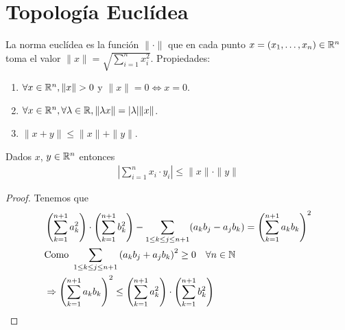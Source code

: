 \section{Topología Euclídea}

\begin{definition}
  La norma euclídea es la función \( \| \cdot \| \) que en cada punto \(x = (x_1, \ldots, x_n) \in \mathbb{R}^n\) toma el valor \( \|x\| = \sqrt{\sum_{i = 1}^n x_i^2} \).
  Propiedades: \begin{enumerate}
    \item \(\forall x \in \mathbb{R}^n, \|x\| > 0\) y \( \|x\| = 0 \iff x = 0\).
    \item \(\forall x \in \mathbb{R}^n, \forall \lambda \in \mathbb{R}, \| \lambda x\| = |\lambda| \|x\| \).
    \item \( \|x+y\| \leq \|x\| + \|y\| \).
  \end{enumerate}
\end{definition}

\begin{prop}
  Dados \(x\), \(y \in \mathbb{R}^n\) entonces \begin{align*}
    \left| \sum_{i = 1}^n x_i \cdot y_i \right| \leq \|x\| \cdot \|y\|
  \end{align*}
  \begin{proof}
    Tenemos que \begin{align*}
      & \left(\sum_{k = 1}^{n+1} a^2_k\right) \cdot \left(\sum_{k = 1}^{n+1} b^2_k \right) - \sum_{1 \leq k \leq j \leq n+1} (a_k b_j - a_j b_k) = {\left(\sum_{k = 1}^{n+1} a_k b_k \right)}^2 \\
      & \text{Como } \sum_{1 \leq k \leq j \leq n+1} {(a_k b_j + a_j b_k)}^2 \geq 0 \quad \forall n \in \mathbb{N} \\
      & \Rightarrow {\left(\sum_{k = 1}^{n+1} a_k b_k \right)}^2 \leq \left(\sum_{k = 1}^{n+1} a^2_k\right) \cdot \left(\sum_{k = 1}^{n+1} b^2_k \right) 
    \end{align*}
  \end{proof}
\end{prop}

